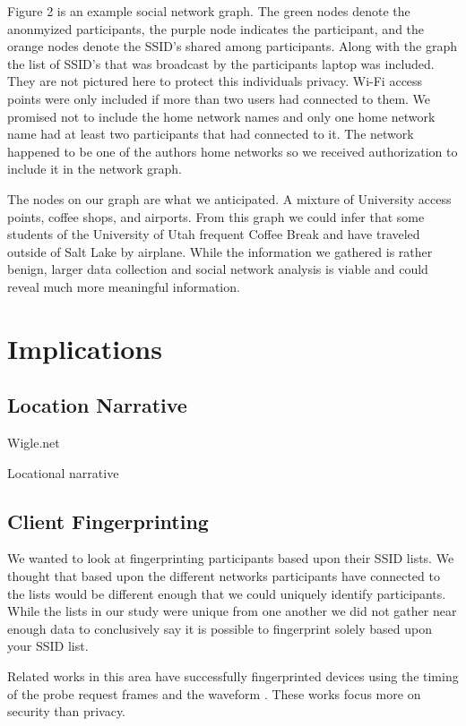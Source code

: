 \documentclass[letterpaper,twocolumn,10pt]{article}
\begin{document}
Figure 2 is an example social network graph. The green nodes denote the anonmyized participants, the purple node indicates the participant, and the orange nodes denote the SSID's shared among participants. Along with the graph the list of SSID's that was broadcast by the participants laptop was included. They are not pictured here to protect this individuals privacy. Wi-Fi access points were only included if more than two users had connected to them. We promised not to include the home network names and only one home network name had at least two participants that had connected to it. The network happened to be one of the authors home networks so we received authorization to include it in the network graph. 

The nodes on our graph are what we anticipated. A mixture of University access points, coffee shops, and airports. From this graph we could infer that some students of the University of Utah frequent Coffee Break and have traveled outside of Salt Lake by airplane. While the information we gathered is rather benign, larger data collection and social network analysis is viable and could reveal much more meaningful information. 

\section{Implications}


\subsection{Location Narrative}
Wigle.net

Locational narrative 

\subsection{Client Fingerprinting}
We wanted to look at fingerprinting participants based upon their SSID lists. We thought that based upon the different networks participants have connected to the lists would be different enough that we could uniquely identify participants. While the lists in our study were unique from one another we did not gather near enough data to conclusively say it is possible to fingerprint solely based upon your SSID list. 

Related works in this area have successfully fingerprinted devices using the timing of the probe request frames \cite{desmond} and the waveform \cite{ureten}. These works focus more on security than privacy. 
\end{document}
